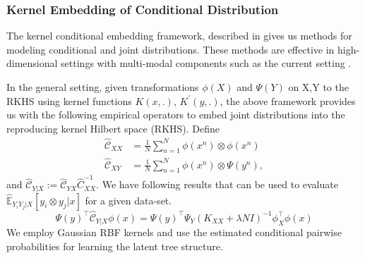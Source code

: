 \documentclass{article}
\begin{document}





\subsubsection*{Kernel Embedding of Conditional Distribution}
The kernel conditional embedding framework, described in \cite{song} gives us methods for modeling conditional and joint distributions.
These methods are effective in high-dimensional settings with multi-modal components such as the current setting .

In the general setting, given transformations $\phi(X)$ and $\Psi(Y)$ on X,Y to the RKHS using kernel functions $K(x,.)$, $K^{'}(y,.)$, the above framework provides us with the following empirical operators to embed joint distributions into the reproducing kernel Hilbert space (RKHS). Define
\begin{align*}
   \hat{\mathcal{C}}_{XX} &= \frac{1}{N} \sum_{n=1}^N\phi(x^{n})\otimes \phi(x^{n}) \\
  \hat{\mathcal{C}}_{XY} &= \frac{1}{N}  \sum_{n=1}^N\phi(x^{n})\otimes \Psi(y^{n}),
\end{align*} and $\hat{\mathcal{C}}_{Y|X} := \hat{\mathcal{C}}_{YX}\hat{C}_{XX}^{-1} $.
We have following results that can be used to evaluate $\hat{\mathbb{E}}_{Y_{i}Y_{j}|X}[y_{i} \otimes y_{j}|x]$ for a given data-set.
  \begin{equation}
 \Psi(y)^{\top}\hat{\mathcal{C}}_{Y|X} \phi(x) = \Psi (y)^{\top} \Psi_{Y} ( K_{XX} + \lambda N I)^{-1} \phi _{X}^{\top} \phi(x)
\end{equation} We employ Gaussian RBF kernels and use the estimated conditional pairwise probabilities for learning the latent tree structure.
\end{document}
